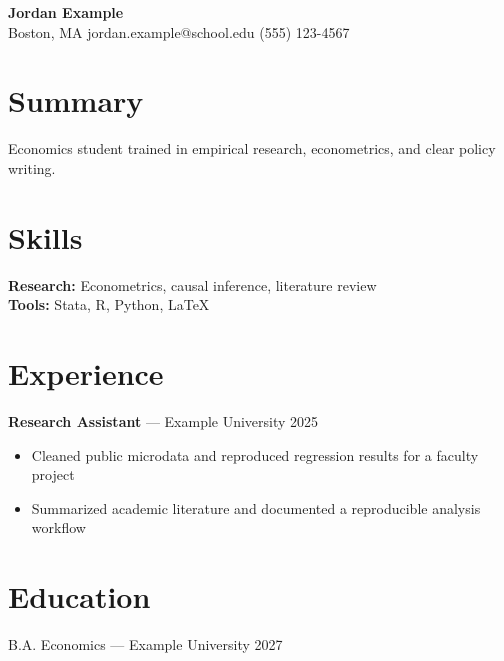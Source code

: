 \documentclass[11pt]{article}
\begin{document}
\begin{center}
{\LARGE \textbf{Jordan Example}} \\
Boston, MA \quad jordan.example@school.edu \quad (555) 123-4567
\end{center}

\section*{Summary}
Economics student trained in empirical research, econometrics, and clear policy writing.

\section*{Skills}
\textbf{Research:} Econometrics, causal inference, literature review \\
\textbf{Tools:} Stata, R, Python, LaTeX

\section*{Experience}
\textbf{Research Assistant} --- Example University \hfill 2025 \\
\begin{itemize}[nosep]
  \item Cleaned public microdata and reproduced regression results for a faculty project
  \item Summarized academic literature and documented a reproducible analysis workflow
\end{itemize}

\section*{Education}
B.A. Economics --- Example University \hfill 2027
\end{document}
